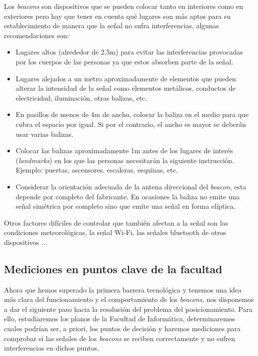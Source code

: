 Los \textit{beacons} son dispositivos que se pueden colocar tanto en interiores como en exteriores pero hay que tener en cuenta qué lugares son más aptos para su establecimiento de manera que la señal no sufra interferencias, algunas recomendaciones son:
\begin{itemize}
	\item Lugares altos (alrededor de 2,5m) para evitar las interferencias provocadas por los cuerpos de las personas ya que estos absorben parte de la señal.
	\item Lugares alejados a un metro aproximadamente de elementos que pueden alterar la intensidad de la señal como elementos metálicos, conductos de electricidad, iluminación, otras balizas, etc.
	\item En pasillos de menos de 4m de ancho, colocar la baliza en el medio para que cubra el espacio por igual. Si por el contrario, el ancho es mayor se deberán usar varias balizas.
	\item Colocar las balizas aproximadamente 1m antes de los lugares de interés (\textit{landmarks}) en los que las personas necesitarán la siguiente instrucción. Ejemplo: puertas, ascensores, escaleras, esquinas, etc.
	\item Considerar la orientación adecuada de la antena direccional del \textit{beacon}, esta depende por completo del fabricante. En ocasiones la baliza no emite una señal simétrica por completo sino que emite una señal en forma elíptica.
\end{itemize}

Otros factores difíciles de controlar que también afectan a la señal son las condiciones meteorológicas, la señal Wi-Fi, las señales bluetooth de otros dispositivos \citep{beaconsinterferences}...

\subsection{Mediciones en puntos clave de la facultad}
\label{sec:medicionesbeacons}

Ahora que hemos superado la primera barrera tecnológica y tenemos una idea más clara del funcionamiento y el comportamiento de los \textit{beacons}, nos disponemos a dar el siguiente paso hacia la resolución del problema del posicionamiento. Para ello, estudiaremos los planos de la Facultad de Informática, determinaremos cuales podrían ser, a priori, los puntos de decisión y haremos mediciones para comprobar si las señales de los \textit{beacons} se reciben correctamente y no sufren interferencias en dichos puntos.

